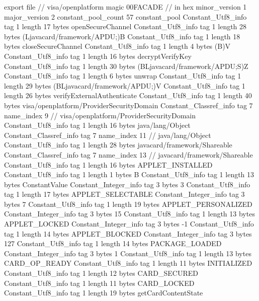 export file {		// visa/openplatform
	magic	00FACADE		 // in hex
	minor_version	1
	major_version	2
	constant_pool_count	57
	constant_pool {
		Constant_Utf8_info {
			tag	1
			length	17
			bytes	openSecureChannel
		}
		Constant_Utf8_info {
			tag	1
			length	28
			bytes	(Ljavacard/framework/APDU;)B
		}
		Constant_Utf8_info {
			tag	1
			length	18
			bytes	closeSecureChannel
		}
		Constant_Utf8_info {
			tag	1
			length	4
			bytes	(B)V
		}
		Constant_Utf8_info {
			tag	1
			length	16
			bytes	decryptVerifyKey
		}
		Constant_Utf8_info {
			tag	1
			length	30
			bytes	(BLjavacard/framework/APDU;S)Z
		}
		Constant_Utf8_info {
			tag	1
			length	6
			bytes	unwrap
		}
		Constant_Utf8_info {
			tag	1
			length	29
			bytes	(BLjavacard/framework/APDU;)V
		}
		Constant_Utf8_info {
			tag	1
			length	26
			bytes	verifyExternalAuthenticate
		}
		Constant_Utf8_info {
			tag	1
			length	40
			bytes	visa/openplatform/ProviderSecurityDomain
		}
		Constant_Classref_info {
			tag	7
			name_index	9		// visa/openplatform/ProviderSecurityDomain
		}
		Constant_Utf8_info {
			tag	1
			length	16
			bytes	java/lang/Object
		}
		Constant_Classref_info {
			tag	7
			name_index	11		// java/lang/Object
		}
		Constant_Utf8_info {
			tag	1
			length	28
			bytes	javacard/framework/Shareable
		}
		Constant_Classref_info {
			tag	7
			name_index	13		// javacard/framework/Shareable
		}
		Constant_Utf8_info {
			tag	1
			length	16
			bytes	APPLET_INSTALLED
		}
		Constant_Utf8_info {
			tag	1
			length	1
			bytes	B
		}
		Constant_Utf8_info {
			tag	1
			length	13
			bytes	ConstantValue
		}
		Constant_Integer_info {
			tag	3
			bytes	3
		}
		Constant_Utf8_info {
			tag	1
			length	17
			bytes	APPLET_SELECTABLE
		}
		Constant_Integer_info {
			tag	3
			bytes	7
		}
		Constant_Utf8_info {
			tag	1
			length	19
			bytes	APPLET_PERSONALIZED
		}
		Constant_Integer_info {
			tag	3
			bytes	15
		}
		Constant_Utf8_info {
			tag	1
			length	13
			bytes	APPLET_LOCKED
		}
		Constant_Integer_info {
			tag	3
			bytes	-1
		}
		Constant_Utf8_info {
			tag	1
			length	14
			bytes	APPLET_BLOCKED
		}
		Constant_Integer_info {
			tag	3
			bytes	127
		}
		Constant_Utf8_info {
			tag	1
			length	14
			bytes	PACKAGE_LOADED
		}
		Constant_Integer_info {
			tag	3
			bytes	1
		}
		Constant_Utf8_info {
			tag	1
			length	13
			bytes	CARD_OP_READY
		}
		Constant_Utf8_info {
			tag	1
			length	11
			bytes	INITIALIZED
		}
		Constant_Utf8_info {
			tag	1
			length	12
			bytes	CARD_SECURED
		}
		Constant_Utf8_info {
			tag	1
			length	11
			bytes	CARD_LOCKED
		}
		Constant_Utf8_info {
			tag	1
			length	19
			bytes	getCardContentState
}}}
